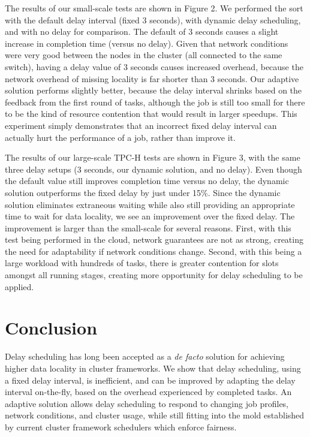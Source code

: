 \documentclass[10pt,conference,compsocconf,letterpaper]{IEEEtran}
\begin{document}
The results of our small-scale tests are shown in Figure 2. We performed the sort with the
default delay interval (fixed 3 seconds), with dynamic delay scheduling, and with no
delay for comparison. The default of 3 seconds causes a slight increase in completion
time (versus no delay). Given that network conditions were very good between the nodes
in the cluster (all connected to the same switch), having a delay value of 3 seconds
causes increased overhead, because the network overhead of missing locality is far shorter
than 3 seconds. Our adaptive solution performs slightly better, because the
delay interval shrinks based on the feedback from the first round of tasks, although the 
job is still too small for there to be the kind of resource contention that would result 
in larger speedups. This experiment simply demonstrates that an incorrect fixed delay
interval can actually hurt the performance of a job, rather than improve it.

The results of our large-scale TPC-H tests are shown in Figure 3, with the same three 
delay setups (3 seconds, our dynamic solution, and no delay). Even though the default
value still improves completion time versus no delay, the dynamic solution outperforms 
the fixed delay by just under 15\%. Since the dynamic solution eliminates extraneous
waiting while also still providing an appropriate time to wait for data locality, we see
an improvement over the fixed delay. The improvement is larger than the small-scale for
several reasons. First, with this test being performed in the cloud, network guarantees
are not as strong, creating the need for adaptability if network conditions change. 
Second, with this being a large workload with hundreds of tasks, there is greater 
contention for slots amongst all running stages, creating more opportunity for delay 
scheduling to be applied.

\section{Conclusion}\label{sec:conclusion}

Delay scheduling has long been accepted as a \textit{de facto} solution for achieving
higher data locality in cluster frameworks. We show that delay scheduling, using a
fixed delay interval, is inefficient, and can be improved by adapting the delay interval
on-the-fly, based on the overhead experienced by completed tasks. An adaptive solution
allows delay scheduling to respond to changing job profiles, network conditions, and
cluster usage, while still fitting into the mold established by current cluster framework
schedulers which enforce fairness.
\end{document}
